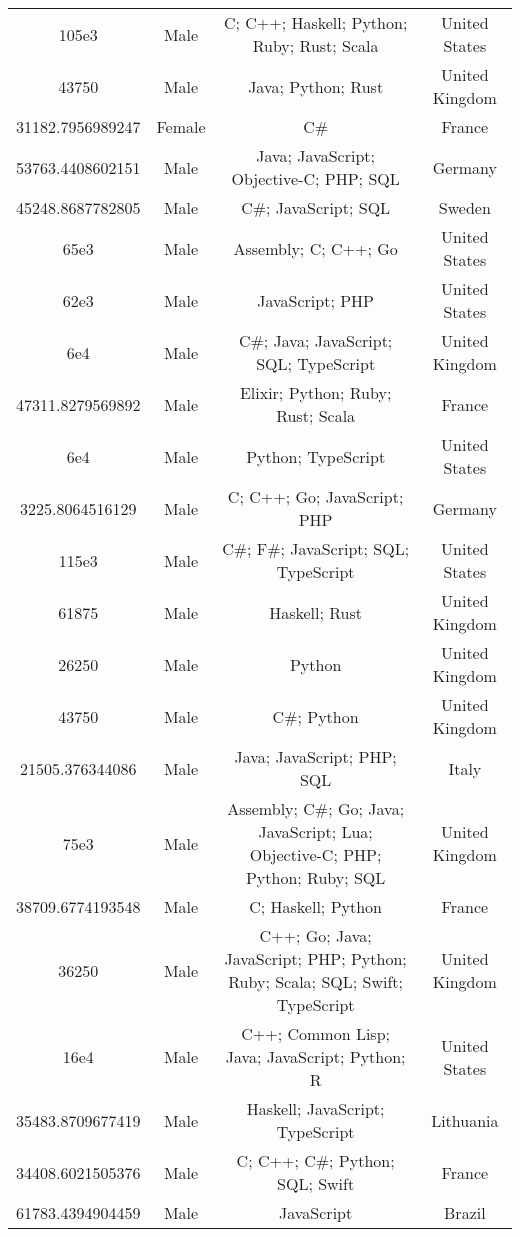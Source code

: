 \begin{center}
\begin{tabular}{ |c|c|c|c| }
105e3  &  Male  &  C; C++; Haskell; Python; Ruby; Rust; Scala  &  United States  \\ 
43750  &  Male  &  Java; Python; Rust  &  United Kingdom  \\ 
31182.7956989247  &  Female  &  C\#  &  France  \\ 
53763.4408602151  &  Male  &  Java; JavaScript; Objective-C; PHP; SQL  &  Germany  \\ 
45248.8687782805  &  Male  &  C\#; JavaScript; SQL  &  Sweden  \\ 
65e3  &  Male  &  Assembly; C; C++; Go  &  United States  \\ 
62e3  &  Male  &  JavaScript; PHP  &  United States  \\ 
6e4  &  Male  &  C\#; Java; JavaScript; SQL; TypeScript  &  United Kingdom  \\ 
47311.8279569892  &  Male  &  Elixir; Python; Ruby; Rust; Scala  &  France  \\ 
6e4  &  Male  &  Python; TypeScript  &  United States  \\ 
3225.8064516129  &  Male  &  C; C++; Go; JavaScript; PHP  &  Germany  \\ 
115e3  &  Male  &  C\#; F\#; JavaScript; SQL; TypeScript  &  United States  \\ 
61875  &  Male  &  Haskell; Rust  &  United Kingdom  \\ 
26250  &  Male  &  Python  &  United Kingdom  \\ 
43750  &  Male  &  C\#; Python  &  United Kingdom  \\ 
21505.376344086  &  Male  &  Java; JavaScript; PHP; SQL  &  Italy  \\ 
75e3  &  Male  &  Assembly; C\#; Go; Java; JavaScript; Lua; Objective-C; PHP; Python; Ruby; SQL  &  United Kingdom  \\ 
38709.6774193548  &  Male  &  C; Haskell; Python  &  France  \\ 
36250  &  Male  &  C++; Go; Java; JavaScript; PHP; Python; Ruby; Scala; SQL; Swift; TypeScript  &  United Kingdom  \\ 
16e4  &  Male  &  C++; Common Lisp; Java; JavaScript; Python; R  &  United States  \\ 
35483.8709677419  &  Male  &  Haskell; JavaScript; TypeScript  &  Lithuania  \\ 
34408.6021505376  &  Male  &  C; C++; C\#; Python; SQL; Swift  &  France  \\ 
61783.4394904459  &  Male  &  JavaScript  &  Brazil  \\ 

\end{tabular}
\end{center}
